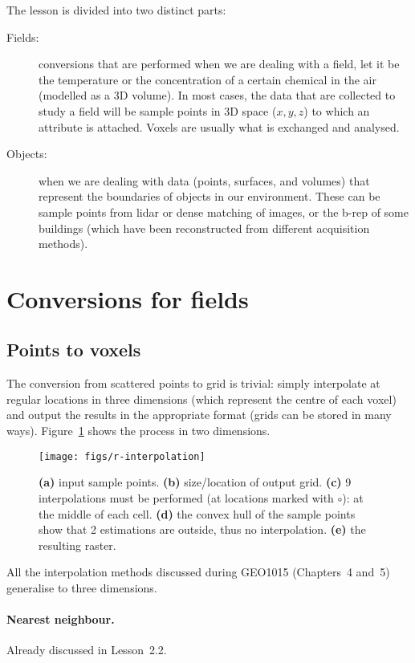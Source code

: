 The lesson is divided into two distinct parts:
\begin{description}
  \item[Fields:] conversions that are performed when we are dealing with a field, let it be the temperature or the concentration of a certain chemical in the air (modelled as a 3D volume). 
  In most cases, the data that are collected to study a field will be sample points in 3D space ($x,y,z$) to which an attribute is attached. 
  Voxels are usually what is exchanged and analysed.
  \item[Objects:] when we are dealing with data (points, surfaces, and volumes) that represent the boundaries of objects in our environment. 
  These can be sample points from lidar or dense matching of images, or the b-rep of some buildings (which have been reconstructed from different acquisition methods).
\end{description}



\newpage
%
\section{Conversions for fields}


\subsection{Points to voxels}

The conversion from scattered points to grid is trivial: simply interpolate at regular locations in three dimensions (which represent the centre of each voxel) and output the results in the appropriate format (grids can be stored in many ways). 
Figure~\ref{fig:r-interpolation} shows the process in two dimensions.
\begin{figure}
  \centering
  \texttt{[image: figs/r-interpolation]}
  \caption{\textbf{(a)} input sample points. \textbf{(b)} size/location of output grid. \textbf{(c)} 9 interpolations must be performed (at locations marked with $\circ$): at the middle of each cell. \textbf{(d)} the convex hull of the sample points show that 2 estimations are outside, thus no interpolation. \textbf{(e)} the resulting raster.}%
\label{fig:r-interpolation}
\end{figure}

All the interpolation methods discussed during GEO1015 (Chapters~4 and~5) generalise to three dimensions.

\paragraph{Nearest neighbour.} 
Already discussed in Lesson~2.2.

